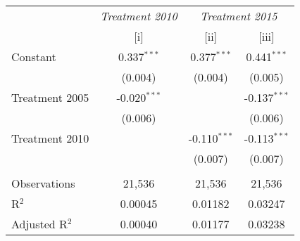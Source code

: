 
\begingroup
\centering
\begin{tabular}{lccc}
   \toprule
    & \textit{Treatment  2010} & \multicolumn{2}{c}{\textit{Treatment 2015}}\\
                   & [i]            & [ii]           & [iii]\\  
   \midrule 
   Constant        & 0.337$^{***}$  & 0.377$^{***}$  & 0.441$^{***}$\\   
                   & (0.004)        & (0.004)        & (0.005)\\   
   Treatment 2005  & -0.020$^{***}$ &                & -0.137$^{***}$\\   
                   & (0.006)        &                & (0.006)\\   
   Treatment  2010 &                & -0.110$^{***}$ & -0.113$^{***}$\\   
                   &                & (0.007)        & (0.007)\\   
    \\
   Observations    & 21,536         & 21,536         & 21,536\\  
   R$^2$           & 0.00045        & 0.01182        & 0.03247\\  
   Adjusted R$^2$  & 0.00040        & 0.01177        & 0.03238\\  
   \bottomrule
\end{tabular}
\par\endgroup


